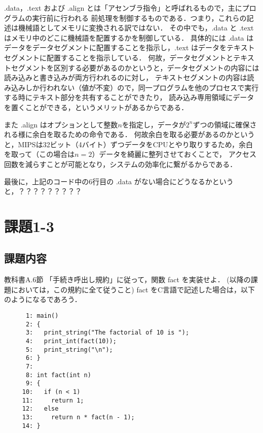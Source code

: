 \documentclass[a4j,11pt]{jarticle}
\begin{document}
.data，.text および .align とは「アセンブラ指令」と呼ばれるもので，主にプログラムの実行前に行われる
前処理を制御するものである．つまり，これらの記述は機械語としてメモリに変換される訳ではない．
その中でも，.data と .text はメモリ中のどこに機械語を配置するかを制御している．
具体的には .data はデータをデータセグメントに配置することを指示し，.text はデータをテキストセグメントに配置することを指示している．
何故，データセグメントとテキストセグメントを区別する必要があるのかというと，データセグメントの内容には読み込みと書き込みが両方行われるのに対し，
テキストセグメントの内容は読み込みしか行われない（値が不変）ので，同一プログラムを他のプロセスで実行する時にテキスト部分を共有することができたり，
読み込み専用領域にデータを置くことができる，というメリットがあるからである．

また .align はオプションとして整数$n$を指定し，データが$2^{n}$ずつの領域に確保される様に余白を取るための命令である．
何故余白を取る必要があるのかというと，MIPSは32ビット（4バイト）ずつデータをCPUとやり取りするため，余白を取って（この場合は$n = 2$）データを綺麗に整列させておくことで，
アクセス回数を減らすことが可能となり，システムの効率化に繋がるからである．

最後に，上記のコード中の6行目の .data がない場合にどうなるかというと，？？？？？？？？？

\section{課題1-3}

\subsection{課題内容}
教科書A.6節 「手続き呼出し規約」に従って，関数 fact を実装せよ．
(以降の課題においては，この規約に全て従うこと) fact をC言語で記述した場合は，以下のようになるであろう．
\begin{verbatim}
      1: main()
      2: {
      3:   print_string("The factorial of 10 is ");
      4:   print_int(fact(10));
      5:   print_string("\n");
      6: }
      7: 
      8: int fact(int n)
      9: {
     10:   if (n < 1)
     11:     return 1;
     12:   else
     13:     return n * fact(n - 1);
     14: }
\end{verbatim}
\end{document}
